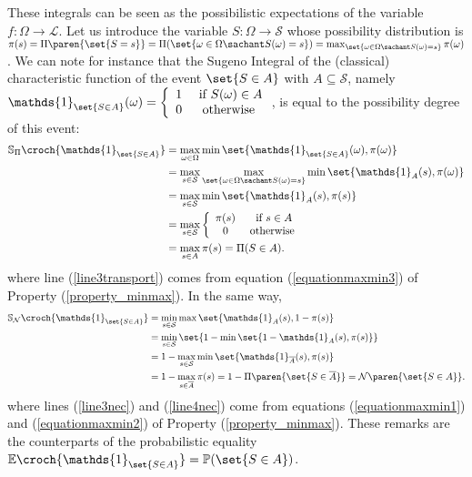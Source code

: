 These integrals can be seen as the possibilistic expectations of the variable $f: \Omega \rightarrow \mathcal{L}$.
Let us introduce the variable $S: \Omega \rightarrow \mathcal{S}$
whose possibility distribution is $\pi(s) = \Pi \paren{ \set{S = s} } = \Pi(\set{ \omega \in \Omega \sachant S(\omega) = s }) = \max_{\set{\omega \in \Omega \sachant S(\omega) = s} } \pi(\omega)$.
We can note for instance that the Sugeno Integral of the (classical) characteristic function of the event $\set{ S \in A}$ with $A \subseteq \mathcal{S}$,
namely $\mathds{1}_{\set{S \in A}}(\omega) =  \left \{ \begin{array}{ccc} 1 & \mbox{ if } S(\omega) \in A \\ 0 & \mbox{ otherwise } \end{array} \right.$, is equal to the possibility degree of this event:
\begin{align}
\nonumber \mathbb{S}_{\Pi} \croch{ \mathds{1}_{\set{S \in A}} } &= \max_{\omega \in \Omega} \min \set{ \mathds{1}_{ \set{S \in A}}(\omega), \pi(\omega) } \\
\nonumber&= \max_{s \in \mathcal{S}} \max_{\set{\omega \in \Omega \sachant S(\omega)=s} } \min \set{ \mathds{1}_{A}(s), \pi(\omega) } \\
\label{line3transport} &= \max_{s \in \mathcal{S}} \min \set{ \mathds{1}_{A}(s), \pi(s) } \\
\nonumber&= \max_{s \in \mathcal{S}} \left \{ \begin{array}{ccc} \pi(s) & \mbox{ if } s \in A \\ 0 & \mbox{ otherwise } \end{array} \right. \\
\label{sugenoIntCharFunc_poss} &= \max_{s \in A} \pi(s) = \Pi(S \in A).
\end{align}
where line (\ref{line3transport}) comes from equation (\ref{equationmaxmin3}) of Property (\ref{property_minmax}).
In the same way, 
\begin{align}
\nonumber \mathbb{S}_{\mathcal{N}} \croch{ \mathds{1}_{\set{S \in A}} } &= \min_{s \in \mathcal{S}} \max \set{ \mathds{1}_{A}(s), 1 - \pi(s) } \\
\label{line3nec} &= \min_{s \in \mathcal{S}} \set{ 1 - \min \set{ 1 - \mathds{1}_{A}(s), \pi(s) } } \\
\label{line4nec} &= 1 -\max_{s \in \mathcal{S}} \min \set{ \mathds{1}_{\overline{A}}(s), \pi(s) } \\
\nonumber &= 1 - \max_{s \in \overline{A}} \pi(s) = 1 - \Pi \paren{ \set{S \in \overline{A}} } = \mathcal{N} \paren{ \set{S \in A}}.
\end{align}
where lines (\ref{line3nec}) and (\ref{line4nec}) come from equations
(\ref{equationmaxmin1}) and (\ref{equationmaxmin2}) 
of Property (\ref{property_minmax}).
These remarks are the counterparts of the probabilistic equality $\mathbb{E} \croch{ \mathds{1}_{\set{S \in A}} } = \mathbb{P}( \set{S\in A})$.

